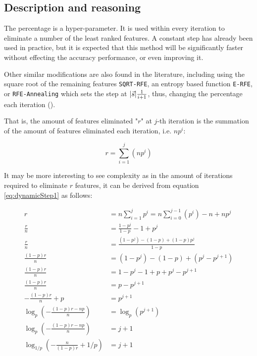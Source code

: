 \subsection{Description and reasoning}
\label{sec:dynamicStep.desc}

The percentage is a hyper-parameter. It is used within every iteration to eliminate a number of the least ranked features. A constant step has already been used in pract\-ice, but it is expected that this method will be significantly faster without effecting the accuracy performance, or even improving it.

Other similar modifications are also found in the literature, including using the square root of the remaining features \texttt{SQRT-RFE}, an entropy based function \texttt{E-RFE}, or \texttt{RFE-Annealing} which sets the step at $|\vec{s}| \frac{1}{i+1}$, thus, changing the percentage each iteration (\cite{ding_improving_2006}).

That is, the amount of features eliminated "$r$" at $j$-th iteration is the summation of the amount of features eliminated each iteration, i.e. $np^i$:

\begin{equation}\label{eq:dynamicStep1}
    r = \sum_{i = 1}^{j}{(np^i)} 
\end{equation}

It may be more interesting to see complexity as in the amount of iterations re\-quired to eliminate $r$ features, it can be derived from equation \ref{eq:dynamicStep1} as follows:

\begin{align*}
    r &= n \sum_{i = 1}^{j}{p^i} = n \sum_{i = 0}^{j-1}{(p^i)} - n + np^j \\
    \frac{r}{n} &= \frac{1-p^j}{1-p} - 1 + p^j \\
    \frac{r}{n} &= \frac{(1-p^j) - (1-p) + (1-p)p^j}{1-p}\\
    \frac{(1-p)r}{n} &= (1-p^j) - (1-p) + (p^j-p^{j+1})\\
    \frac{(1-p)r}{n} &= 1 -p^j -1 + p + p^j - p^{j+1}\\
    \frac{(1-p)r}{n} &= p - p^{j+1}\\
    - \frac{(1-p)r}{n} + p &= p^{j+1}\\
    \log_{p} \left( - \frac{(1-p)r - np}{n} \right) &= \log_{p} (p^{j+1})\\
    \log_{p} \left( - \frac{(1-p)r - np}{n} \right) &= j + 1\\
    \log_{1/p} \left( - \frac{n}{(1-p)r} + 1/p \right) &= j + 1\\
\end{align*}

